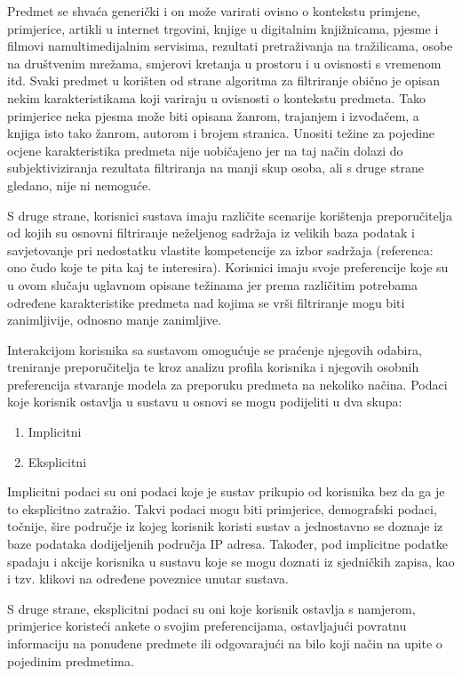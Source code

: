 \documentclass[times, utf8, diplomski, numeric]{fer}
\begin{document}
Predmet se shvaća generički i on može varirati ovisno o kontekstu primjene,
primjerice, artikli u internet trgovini, knjige u digitalnim knjižnicama, pjesme
i filmovi namultimedijalnim servisima, rezultati pretraživanja na tražilicama,
osobe na društvenim mrežama, smjerovi kretanja u prostoru i u ovisnosti s
vremenom itd. Svaki predmet u korišten od strane algoritma za filtriranje obično
je opisan nekim karakteristikama koji variraju u ovisnosti o kontekstu predmeta.
Tako primjerice neka pjesma može biti opisana žanrom, trajanjem i izvođačem, a
knjiga isto tako žanrom, autorom i brojem stranica. Unositi težine za pojedine
ocjene karakteristika predmeta nije uobičajeno jer na taj način dolazi do
subjektiviziranja rezultata filtriranja na manji skup osoba, ali s druge strane
gledano, nije ni nemoguće.

S druge strane, korisnici sustava imaju različite scenarije korištenja
preporučitelja od kojih su osnovni filtriranje neželjenog sadržaja iz velikih
baza podatak i savjetovanje pri nedostatku vlastite kompetencije za izbor
sadržaja (referenca: ono čudo koje te pita kaj te interesira). Korisnici imaju
svoje preferencije koje su u ovom slučaju uglavnom opisane težinama jer prema
različitim potrebama određene karakteristike predmeta nad kojima se vrši
filtriranje mogu biti zanimljivije, odnosno manje zanimljive.

Interakcijom korisnika sa sustavom omogućuje se praćenje njegovih odabira,
treniranje preporučitelja te kroz analizu profila korisnika i njegovih osobnih
preferencija stvaranje modela za preporuku predmeta na nekoliko načina. Podaci
koje korisnik ostavlja u sustavu u osnovi se mogu podijeliti u dva skupa:
\begin{enumerate}
  \item Implicitni
  \item Eksplicitni
\end{enumerate}
Implicitni podaci su oni podaci koje je sustav prikupio od korisnika bez da ga
je to eksplicitno zatražio. Takvi podaci mogu biti primjerice, demografski
podaci, točnije, šire područje iz kojeg korisnik koristi sustav a jednostavno se
doznaje iz baze podataka dodijeljenih područja  IP adresa.
Također, pod implicitne podatke spadaju i akcije korisnika u sustavu koje se
mogu doznati iz sjedničkih zapisa, kao i tzv. klikovi na određene poveznice
unutar sustava.

S druge strane, eksplicitni podaci su oni koje korisnik ostavlja s namjerom,
primjerice koristeći ankete o svojim preferencijama, ostavljajući povratnu
informaciju na ponuđene predmete  ili odgovarajući na bilo
koji način na upite o pojedinim predmetima.
\end{document}
